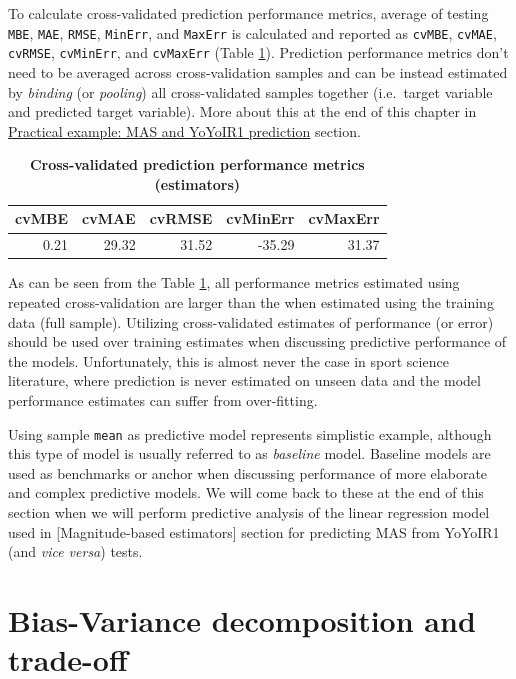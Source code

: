 \documentclass[
]{book}
\begin{document}
To calculate cross-validated prediction performance metrics, average of testing \texttt{MBE}, \texttt{MAE}, \texttt{RMSE}, \texttt{MinErr}, and \texttt{MaxErr} is calculated and reported as \texttt{cvMBE}, \texttt{cvMAE}, \texttt{cvRMSE}, \texttt{cvMinErr}, and \texttt{cvMaxErr} (Table \ref{tab:cv-performance-metrics}). Prediction performance metrics don't need to be averaged across cross-validation samples and can be instead estimated by \emph{binding} (or \emph{pooling}) all cross-validated samples together (i.e.~target variable and predicted target variable). More about this at the end of this chapter in \protect\hyperlink{practical-example-mas-and-yoyoir1-prediction}{Practical example: MAS and YoYoIR1 prediction} section.



\begin{table}

\caption{\label{tab:cv-performance-metrics}\textbf{Cross-validated prediction performance metrics (estimators)}}
\centering
\begin{tabular}[t]{rrrrr}
\toprule
cvMBE & cvMAE & cvRMSE & cvMinErr & cvMaxErr\\
\midrule
0.21 & 29.32 & 31.52 & -35.29 & 31.37\\
\bottomrule
\end{tabular}
\end{table}

As can be seen from the Table \ref{tab:cv-performance-metrics}, all performance metrics estimated using repeated cross-validation are larger than the when estimated using the training data (full sample). Utilizing cross-validated estimates of performance (or error) should be used over training estimates when discussing predictive performance of the models. Unfortunately, this is almost never the case in sport science literature, where prediction is never estimated on unseen data and the model performance estimates can suffer from over-fitting.

Using sample \texttt{mean} as predictive model represents simplistic example, although this type of model is usually referred to as \emph{baseline} model. Baseline models are used as benchmarks or anchor when discussing performance of more elaborate and complex predictive models. We will come back to these at the end of this section when we will perform predictive analysis of the linear regression model used in {[}Magnitude-based estimators{]} section for predicting MAS from YoYoIR1 (and \emph{vice versa}) tests.

\hypertarget{bias-variance-decomposition-and-trade-off}{%
\section{Bias-Variance decomposition and trade-off}\label{bias-variance-decomposition-and-trade-off}}
\end{document}

